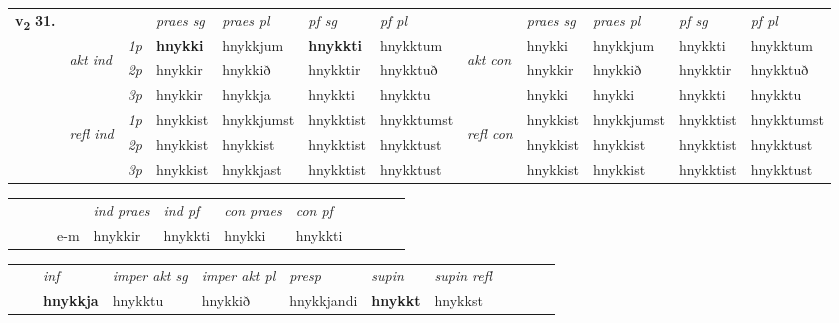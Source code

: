 \begin{tabular}{llllllllllll} \toprule
\multirow{4}{*}{{{\textbf{v{\textsubscript{2}}} \Large{\textbf{31.}}}}}  & &   &  \textit{praes sg}  & \textit{praes pl}  &\textit{ pf sg} & \textit{pf pl} &  &  \textit{praes sg}  & \textit{praes pl}  & \textit{pf sg} & \textit{pf pl } \\*
	\cmidrule{4-7} \cmidrule{9-12}
 & \multirow{3}{*}{\begin{turn}{90}\textit{akt ind}\end{turn}} & {\textit{1p}} & \textbf{hnykki} & hnykkjum    & \textbf{hnykkti} & hnykktum & \multirow{3}{*}{\begin{turn}{90}\textit{akt con}\end{turn}} &hnykki & hnykkjum & hnykkti & hnykktum\\*
& &  {\textit{2p}} &  hnykkir  & hnykkið   & hnykktir & hnykktuð & & hnykkir & hnykkið & hnykktir & hnykktuð \\*
& &  {\textit{3p}} & hnykkir & hnykkja   & hnykkti & hnykktu & & hnykki & hnykki& hnykkti & hnykktu  \\*
\cmidrule{4-7} \cmidrule{9-12}
 &\multirow{3}{*}{\begin{turn}{90}\textit{refl ind}\end{turn}} & {\textit{1p}} & hnykkist & hnykkjumst    & hnykktist & hnykktumst & \multirow{3}{*}{\begin{turn}{90}\textit{refl con}\end{turn}}  &hnykkist & hnykkjumst & hnykktist & hnykktumst\\*
 &&  {\textit{2p}} &  hnykkist  & hnykkist   & hnykktist & hnykktust & &hnykkist & hnykkist & hnykktist & hnykktust \\*
& &  {\textit{3p}} & hnykkist & hnykkjast   & hnykktist & hnykktust & & hnykkist & hnykkist& hnykktist & hnykktust  \\*
\cmidrule{4-7} \cmidrule{9-12}
\end{tabular}


\begin{tabular}{llllllllllll}
 & &  & &  \textit{ind praes} & \textit{ind pf} & \textit{con praes} & \textit{con pf} \\*
&  & & e-m & hnykkir & hnykkti & hnykki & hnykkti \\*
\cmidrule{5-9}
\end{tabular}


\begin{tabular}{llllllllllll}
 & & \textit{inf} & \textit{imper akt sg} & \textit{imper akt pl}   & \textit{presp} & \textit{supin} & \textit{supin refl}      \\*
  & & \textbf{hnykkja} & hnykktu  & hnykkið   & hnykkjandi &  \textbf{hnykkt} & hnykkst  \\*
\cmidrule{1-12}
\end{tabular}



